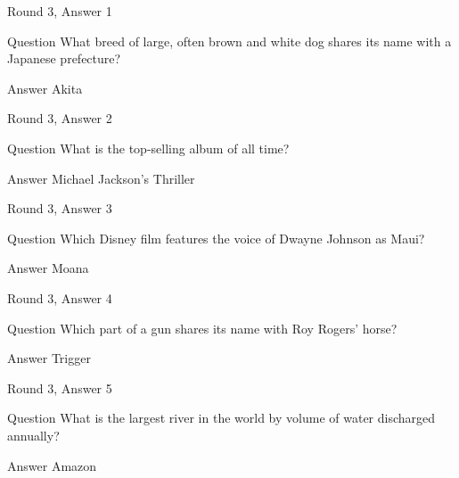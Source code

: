 \documentclass[11pt]{beamer}
\begin{document}
\begin{frame}[t]{Round 3, Answer 1}
\vspace{2em}
\begin{block}{Question}
What breed of large, often brown and white dog shares its name with a Japanese prefecture\@?
\end{block}
\pause{}
\begin{block}{Answer}
Akita
\end{block}
\end{frame}
    

\begin{frame}[t]{Round 3, Answer 2}
\vspace{2em}
\begin{block}{Question}
What is the top-selling album of all time\@?
\end{block}
\pause{}
\begin{block}{Answer}
Michael Jackson's Thriller
\end{block}
\end{frame}
    

\begin{frame}[t]{Round 3, Answer 3}
\vspace{2em}
\begin{block}{Question}
Which Disney film features the voice of Dwayne Johnson as Maui\@?
\end{block}
\pause{}
\begin{block}{Answer}
Moana
\end{block}
\end{frame}
    

\begin{frame}[t]{Round 3, Answer 4}
\vspace{2em}
\begin{block}{Question}
Which part of a gun shares its name with Roy Rogers' horse\@?
\end{block}
\pause{}
\begin{block}{Answer}
Trigger
\end{block}
\end{frame}
    

\begin{frame}[t]{Round 3, Answer 5}
\vspace{2em}
\begin{block}{Question}
What is the largest river in the world by volume of water discharged annually\@?
\end{block}
\pause{}
\begin{block}{Answer}
Amazon
\end{block}
\end{frame}
    
\end{document}
